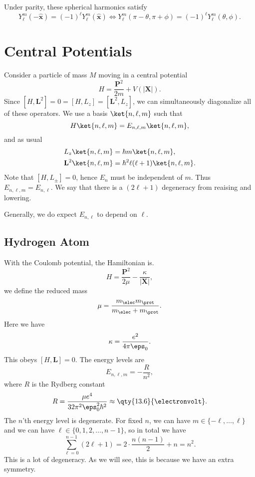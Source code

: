 \documentclass[12pt]{article}
\begin{document}

Under parity, these spherical harmonics satisfy
\[
Y_\ell^m(-\mathbf{\hat x}) = (-1)^\ell Y_\ell^m(\mathbf{\hat x}) \iff Y_\ell^m(\pi - \theta, \pi + \phi) = (-1)^\ell Y_\ell^m(\theta, \phi).
\]

\newpage

\section{Central Potentials}
\label{sec:cent_potent}

Consider a particle of mass $M$ moving in a central potential
\[
H = \frac{\mathbf{P}^2}{2m} + V(|\mathbf{X}|).
\]
Since $[H, \mathbf{L}^2] = 0 = [H, L_z] = [\mathbf{L}^2, L_z]$, we can simultaneously diagonalize all of these operators. We use a basis $\ket{n, \ell, m}$ such that
\[
	H\ket{n, \ell, m} = E_{n, \ell, m} \ket{n, \ell, m},
\]
and as usual
\begin{align*}
	L_z\ket{n, \ell, m} &= \hbar m \ket{n, \ell, m}, \\
	\mathbf{L}^2 \ket{n, \ell, m} &= \hbar^2 \ell(\ell+1)\ket{n, \ell, m}.
\end{align*}
Note that $[H, L_{\pm}] = 0$, hence $E_n$ must be independent of $m$. Thus $E_{n, \ell, m} = E_{n, \ell}$. We say that there is a $(2\ell+1)$ degeneracy from reaising and lowering.

Generally, we do expect $E_{n, \ell}$ to depend on $\ell$.

\subsection{Hydrogen Atom}
\label{sub:h_atom}

With the Coulomb potential, the Hamiltonian is.
\[
H = \frac{\mathbf{P}^2}{2 \mu} - \frac{\kappa}{|\mathbf{X}|},
\]
we define the reduced mass
\[
\mu = \frac{m_{\elec}m_{\prot}}{m_{\elec} + m_{\prot}}.
\]
Here we have
\[
\kappa = \frac{e^2}{4 \pi \eps_0}.
\]
This obeys $[H, \mathbf{L}] = 0$. The energy levels are
\[
E_{n, \ell , m} = - \frac{R}{n^2},
\]
where $R$ is the Rydberg constant
\[
	R = \frac{\mu e^{4}}{32 \pi^2 \eps_0^2 \hbar^2} \approx \qty{13.6}{\electronvolt}.
\]
The $n$'th energy level is degenerate. For fixed $n$, we can have $m \in \{-\ell , \ldots, \ell \}$ and we can have $\ell \in \{0, 1, 2, \ldots, n-1\}$, so in total we have
\[
\sum_{\ell =0}^{n-1}(2\ell +1)=2\cdot\frac{n(n-1)}{2}+n=n^2.
\]
This is a lot of degeneracy. As we will see, this is because we have an extra symmetry.
\end{document}

